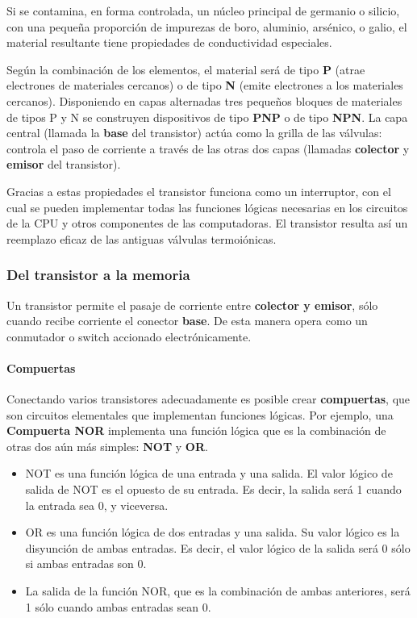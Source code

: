 \documentclass[spanish,a4paper,]{article}
\providecommand{\tightlist}{%
  \setlength{\itemsep}{0pt}\setlength{\parskip}{0pt}}
\let\oldparagraph\paragraph
\renewcommand{\paragraph}[1]{\oldparagraph{#1}\mbox{}}
\begin{document}
Si se contamina, en forma controlada, un núcleo principal de germanio o
silicio, con una pequeña proporción de impurezas de boro, aluminio,
arsénico, o galio, el material resultante tiene propiedades de
conductividad especiales.

Según la combinación de los elementos, el material será de tipo
\textbf{P} (atrae electrones de materiales cercanos) o de tipo
\textbf{N} (emite electrones a los materiales cercanos). Disponiendo en
capas alternadas tres pequeños bloques de materiales de tipos P y N se
construyen dispositivos de tipo \textbf{PNP} o de tipo \textbf{NPN}. La
capa central (llamada la \textbf{base} del transistor) actúa como la
grilla de las válvulas: controla el paso de corriente a través de las
otras dos capas (llamadas \textbf{colector} y \textbf{emisor} del
transistor).

Gracias a estas propiedades el transistor funciona como un interruptor,
con el cual se pueden implementar todas las funciones lógicas necesarias
en los circuitos de la CPU y otros componentes de las computadoras. El
transistor resulta así un reemplazo eficaz de las antiguas válvulas
termoiónicas.

\hypertarget{del-transistor-a-la-memoria}{%
\subsubsection{Del transistor a la
memoria}\label{del-transistor-a-la-memoria}}

Un transistor permite el pasaje de corriente entre \textbf{colector y
emisor}, sólo cuando recibe corriente el conector \textbf{base}. De esta
manera opera como un conmutador o switch accionado electrónicamente.

\hypertarget{compuertas}{%
\paragraph{Compuertas}\label{compuertas}}

Conectando varios transistores adecuadamente es posible crear
\textbf{compuertas}, que son circuitos elementales que implementan
funciones lógicas. Por ejemplo, una \textbf{Compuerta NOR} implementa
una función lógica que es la combinación de otras dos aún más simples:
\textbf{NOT} y \textbf{OR}.

\begin{itemize}
\tightlist
\item
  NOT es una función lógica de una entrada y una salida. El valor lógico
  de salida de NOT es el opuesto de su entrada. Es decir, la salida será
  1 cuando la entrada sea 0, y viceversa.
\item
  OR es una función lógica de dos entradas y una salida. Su valor lógico
  es la disyunción de ambas entradas. Es decir, el valor lógico de la
  salida será 0 sólo si ambas entradas son 0.
\item
  La salida de la función NOR, que es la combinación de ambas
  anteriores, será 1 sólo cuando ambas entradas sean 0.
\end{itemize}
\end{document}
